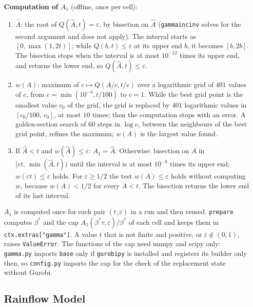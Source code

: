 \textbf{Computation of $A_1$} (offline, once per cell):
\begin{enumerate}[leftmargin=1.5em, nosep]
  \item $\hat A$: the root of $Q(\hat A, t) = \varepsilon$, by bisection on $\hat A$ (\texttt{gammaincinv} solves for the second argument and does not apply). The interval starts as $[0, \max(1, 2t)]$; while $Q(b, t) \le \varepsilon$ at its upper end $b$, it becomes $[b, 2b]$. The bisection stops when the interval is at most $10^{-12}$ times its upper end, and returns the lower end, so $Q(\hat A, t) \le \varepsilon$.
  \item $w(A)$: maximum of $c \mapsto Q(A/c, t/c)$ over a logarithmic grid of $401$ values of $c$, from $c = \min(10^{-4}, t/100)$ to $c = 1$. While the best grid point is the smallest value $c_0$ of the grid, the grid is replaced by $401$ logarithmic values in $[c_0/100,\, c_0]$, at most $10$ times; then the computation stops with an error. A golden-section search of $60$ steps in $\log c$, between the neighbours of the best grid point, refines the maximum; $w(A)$ is the largest value found.
  \item If $\hat A < t$ and $w(\hat A) \le \varepsilon$: $A_1 = \hat A$. Otherwise: bisection on $A$ in $[\varepsilon t,\, \min(\hat A, t))$ until the interval is at most $10^{-9}$ times its upper end; $w(\varepsilon t) \le \varepsilon$ holds. For $\varepsilon \ge 1/2$ the test $w(A) \le \varepsilon$ holds without computing $w$, because $w(A) < 1/2$ for every $A < t$. The bisection returns the lower end of its last interval.
\end{enumerate}
$A_1$ is computed once for each pair $(t, \varepsilon)$ in a run and then reused.
\texttt{prepare} computes $\beta^*$ and the cap $A_1(\beta^*\tau, \varepsilon)/\beta^*$ of each cell and keeps them in
\texttt{ctx.extras["gamma"]}. A value $t$ that is not finite and positive, or $\varepsilon \notin (0, 1)$, raises
\texttt{ValueError}. The functions of the cap need numpy and scipy only: \texttt{gamma.py} imports \texttt{base}
only if \texttt{gurobipy} is installed and registers its builder only then, so \texttt{config.py} imports the cap
for the check of the replacement state without Gurobi.

\subsection{Rainflow Model}
\label{sec:dyn_rainflow}

